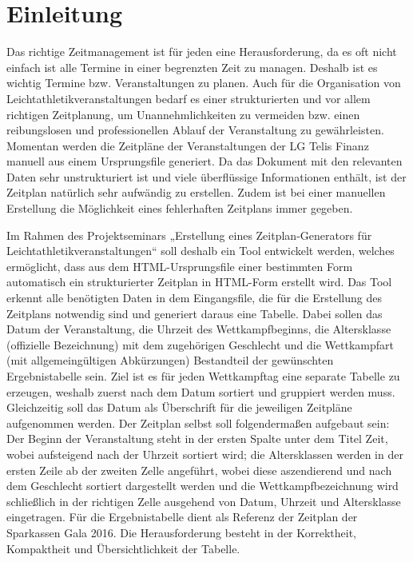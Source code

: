 
\chapter{Einleitung}
\label{chap:Einleitung}

Das richtige Zeitmanagement ist für jeden eine Herausforderung, da es oft nicht einfach ist alle Termine in einer begrenzten Zeit zu managen. Deshalb ist es wichtig Termine bzw. Veranstaltungen zu planen. Auch für die Organisation von Leichtathletikveranstaltungen bedarf es einer strukturierten und vor allem richtigen Zeitplanung, um Unannehmlichkeiten zu vermeiden bzw. einen reibungslosen und professionellen Ablauf der Veranstaltung zu gewährleisten. Momentan werden die Zeitpläne der Veranstaltungen der LG Telis Finanz manuell aus einem Ursprungsfile generiert. Da das Dokument mit den relevanten Daten sehr unstrukturiert ist und viele überflüssige Informationen enthält, ist der Zeitplan natürlich sehr aufwändig zu erstellen. Zudem ist bei einer manuellen Erstellung die Möglichkeit eines fehlerhaften Zeitplans immer gegeben.

Im Rahmen des Projektseminars „Erstellung eines Zeitplan-Generators für Leichtathletikveranstaltungen“ soll deshalb ein Tool entwickelt werden, welches ermöglicht, dass aus dem HTML-Ursprungsfile einer bestimmten Form automatisch ein strukturierter Zeitplan in HTML-Form erstellt wird. Das Tool erkennt alle benötigten Daten in dem Eingangsfile, die für die Erstellung des Zeitplans notwendig sind und generiert daraus eine Tabelle. Dabei sollen das Datum der Veranstaltung, die Uhrzeit des Wettkampfbeginns, die Altersklasse (offizielle Bezeichnung) mit dem zugehörigen Geschlecht und die Wettkampfart (mit allgemeingültigen Abkürzungen) Bestandteil der gewünschten Ergebnistabelle sein. Ziel ist es für jeden Wettkampftag eine separate Tabelle zu erzeugen, weshalb zuerst nach dem Datum sortiert und gruppiert werden muss. Gleichzeitig soll das Datum als Überschrift für die jeweiligen Zeitpläne aufgenommen werden. Der Zeitplan selbst soll folgendermaßen aufgebaut sein: Der Beginn der Veranstaltung steht in der ersten Spalte unter dem Titel Zeit, wobei aufsteigend nach der Uhrzeit sortiert wird; die Altersklassen werden in der ersten Zeile ab der zweiten Zelle angeführt, wobei diese aszendierend und nach dem Geschlecht sortiert dargestellt werden und die Wettkampfbezeichnung wird schließlich in der richtigen Zelle ausgehend von Datum, Uhrzeit und Altersklasse eingetragen. Für die Ergebnistabelle dient als Referenz der Zeitplan der Sparkassen Gala 2016. 
Die Herausforderung besteht in der Korrektheit, Kompaktheit und Übersichtlichkeit der Tabelle.

